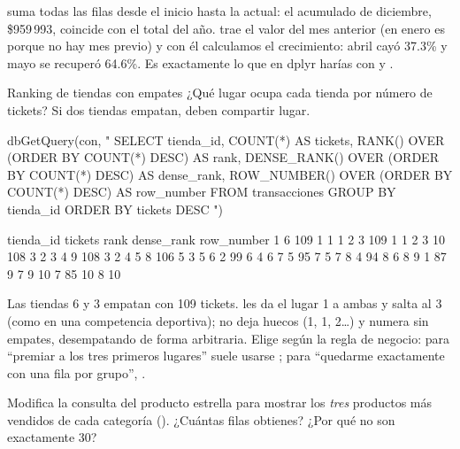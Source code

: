  suma todas las filas desde el
inicio hasta la actual: el acumulado de diciembre, \$959\,993, coincide con
el total del año.  trae el valor del mes anterior (en
enero es  porque no hay mes previo) y con él calculamos el
crecimiento: abril cayó 37.3\% y mayo se recuperó 64.6\%. Es exactamente lo
que en dplyr harías con  y .

\begin{ejemplo}{Ranking de tiendas con empates}
¿Qué lugar ocupa cada tienda por número de tickets? Si dos tiendas empatan,
deben compartir lugar.
\end{ejemplo}

\begin{rcode}
dbGetQuery(con, "
  SELECT tienda_id,
         COUNT(*)                                   AS tickets,
         RANK()       OVER (ORDER BY COUNT(*) DESC) AS rank,
         DENSE_RANK() OVER (ORDER BY COUNT(*) DESC) AS dense_rank,
         ROW_NUMBER() OVER (ORDER BY COUNT(*) DESC) AS row_number
  FROM transacciones
  GROUP BY tienda_id
  ORDER BY tickets DESC
")
\end{rcode}

\begin{rsalida}
   tienda_id tickets rank dense_rank row_number
1          6     109    1          1          1
2          3     109    1          1          2
3         10     108    3          2          3
4          9     108    3          2          4
5          8     106    5          3          5
6          2      99    6          4          6
7          5      95    7          5          7
8          4      94    8          6          8
9          1      87    9          7          9
10         7      85   10          8         10
\end{rsalida}

Las tiendas 6 y 3 empatan con 109 tickets.  les da el lugar
1 a ambas y salta al 3 (como en una competencia deportiva);
 no deja huecos (1, 1, 2\ldots) y
 numera sin empates, desempatando de forma arbitraria.
Elige según la regla de negocio: para ``premiar a los tres primeros
lugares'' suele usarse ; para ``quedarme exactamente con
una fila por grupo'', .

\begin{hazlotu}
Modifica la consulta del producto estrella para mostrar los
\emph{tres} productos más vendidos de cada categoría ().
¿Cuántas filas obtienes? ¿Por qué no son exactamente 30?
\end{hazlotu}

